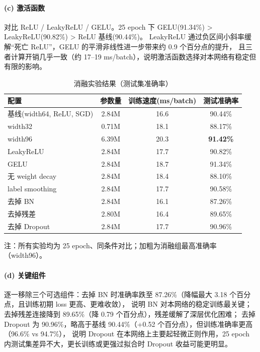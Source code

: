 \documentclass[11pt]{ctexart}
\begin{document}
\paragraph{(c) 激活函数}
对比 ReLU / LeakyReLU / GELU。25 epoch 下 GELU(91.34\%) > LeakyReLU(90.82\%) > ReLU 基线(90.44\%)。
LeakyReLU 通过负区间小斜率缓解“死亡 ReLU”，GELU 的平滑非线性进一步带来约 0.9 个百分点的提升，
且三者计算开销几乎一致（约 17--19 ms/batch），说明激活函数选择对本网络有稳定但有限的影响。

\begin{table}[h]
\centering
\caption{消融实验结果（测试集准确率）}
\label{tab:ablation}
\begin{tabular}{lccc}
\toprule
配置 & 参数量 & 训练速度(ms/batch) & 测试准确率 \\
\midrule
基线(width64, ReLU, SGD) & 2.84M & 16.6 & 90.44\% \\
width32 & 0.71M & 18.1 & 88.17\% \\
width96 & 6.39M & 20.3 & \textbf{91.42\%} \\
LeakyReLU & 2.84M & 17.7 & 90.82\% \\
GELU & 2.84M & 18.7 & 91.34\% \\
无 weight decay & 2.84M & 18.4 & 88.10\% \\
label smoothing & 2.84M & 17.7 & 90.58\% \\
去掉 BN & 2.84M & 16.1 & 87.26\% \\
去掉残差 & 2.80M & 16.4 & 89.65\% \\
去掉 Dropout & 2.84M & 17.7 & 90.96\% \\
\bottomrule
\end{tabular}

\vspace{2pt}
{\footnotesize 注：所有实验均为 25 epoch、同条件对比；加粗为消融组最高准确率（width96）。}
\end{table}

\paragraph{(d) 关键组件}
逐一移除三个可选组件：去掉 BN 时准确率跌至 87.26\%（降幅最大 3.18 个百分点，且训练初期 loss 更高、更难收敛），
说明 BN 对本网络的稳定训练最关键；去掉残差连接降到 89.65\%（降 0.79 个百分点），残差缓解了深层优化困难；
去掉 Dropout 为 90.96\%，略高于基线 90.44\%（+0.52 个百分点），但训练准确率更高（96.6\% vs 94.7\%），
说明 Dropout 在本网络上主要起轻微正则作用，25 epoch 内测试集差异不大，更长训练或更强过拟合时 Dropout 收益可能更明显。
\end{document}
